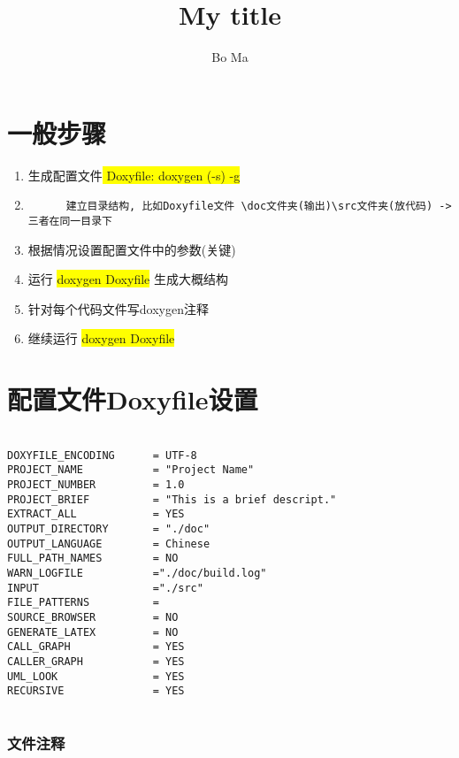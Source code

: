 \documentclass[a4paper]{ctexart}
\title{My title}
\author{Bo Ma}
\begin{document}
\maketitle
\section{一般步骤}%
\label{sec:gene-ste}
\begin{enumerate}
  \item 生成配置文件\colorbox{yellow}{ Doxyfile: doxygen (-s) -g}
  \item \begin{verbatim}
      建立目录结构, 比如Doxyfile文件 \doc文件夹(输出)\src文件夹(放代码) ->三者在同一目录下
    \end{verbatim} 
  \item 根据情况设置配置文件中的参数(关键)
  \item 运行 {\colorbox {yellow} {doxygen Doxyfile}} 生成大概结构
  \item 针对每个代码文件写doxygen注释
  \item 继续运行 {\colorbox {yellow} {doxygen Doxyfile}}
\end{enumerate}


\section{配置文件Doxyfile设置}%
\begin{verbatim}

DOXYFILE_ENCODING      = UTF-8
PROJECT_NAME           = "Project Name"
PROJECT_NUMBER         = 1.0
PROJECT_BRIEF          = "This is a brief descript."
EXTRACT_ALL            = YES
OUTPUT_DIRECTORY       = "./doc"
OUTPUT_LANGUAGE        = Chinese
FULL_PATH_NAMES        = NO
WARN_LOGFILE           ="./doc/build.log"
INPUT                  ="./src"
FILE_PATTERNS          =
SOURCE_BROWSER         = NO
GENERATE_LATEX         = NO
CALL_GRAPH             = YES
CALLER_GRAPH           = YES
UML_LOOK               = YES
RECURSIVE              = YES
 
\end{verbatim}


\subsubsection{文件注释}%
\label{ssub:wen_jian_zhu_shi_}
\end{document}
